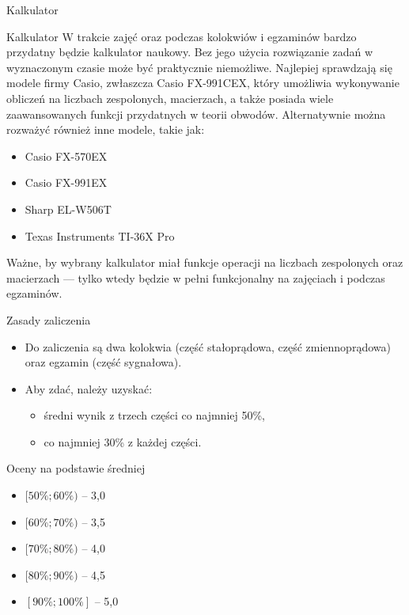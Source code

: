 \begin{frame}{Kalkulator}
	\begin{block}{Kalkulator}
		W trakcie zajęć oraz podczas kolokwiów i egzaminów bardzo przydatny będzie kalkulator naukowy.
		Bez jego użycia rozwiązanie zadań w wyznaczonym czasie może być praktycznie niemożliwe.
		Najlepiej sprawdzają się modele firmy Casio, zwłaszcza Casio FX-991CEX, który umożliwia wykonywanie obliczeń na liczbach zespolonych, macierzach, a także posiada wiele zaawansowanych funkcji przydatnych w teorii obwodów.
		Alternatywnie można rozważyć również inne modele, takie jak:
		\begin{itemize}
			\item[\bt] Casio FX-570EX
			\item[\bt] Casio FX-991EX
			\item[\bt] Sharp EL-W506T
			\item[\bt] Texas Instruments TI-36X Pro
		\end{itemize}
		Ważne, by wybrany kalkulator miał funkcje operacji na liczbach zespolonych oraz macierzach — tylko wtedy będzie w pełni funkcjonalny na zajęciach i podczas egzaminów.
	\end{block}
\end{frame}

\begin{frame}{Zasady zaliczenia}
	\begin{itemize}
		\item[\bt] Do zaliczenia są dwa kolokwia (część stałoprądowa, część zmiennoprądowa) oraz egzamin (część sygnałowa).
		\item[\bt] Aby zdać, należy uzyskać:
		      \begin{itemize}
			      \item[\bt] średni wynik z trzech części co najmniej 50\%,
			      \item[\bt] co najmniej 30\% z każdej części.
		      \end{itemize}
	\end{itemize}
	\begin{block}{Oceny na podstawie średniej}
		\begin{itemize}
			\item[\bt] $[50\%; 60\%)$ – 3{,}0
			\item[\bt] $[60\%; 70\%)$ – 3{,}5
			\item[\bt] $[70\%; 80\%)$ – 4{,}0
			\item[\bt] $[80\%; 90\%)$ – 4{,}5
			\item[\bt] $[90\%; 100\%]$ – 5{,}0
		\end{itemize}
	\end{block}
\end{frame}

